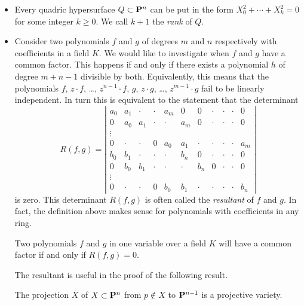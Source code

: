 \begin{itemize}
\item
  Every quadric hypersurface $Q \subset \P^n$ can be put in the form $X_0^2 + \cdots + X_k^2 = 0$ for some integer $k \geq 0$. We call $k+1$ the \emph{rank} of $Q$.
  
\item
  Consider two polynomials $f$ and $g$ of degrees $m$ and $n$ respectively with coefficients in a field $K$. We would like to investigate when $f$ and $g$ have a common factor. This happens if and only if there exists a polynomial $h$ of degree $m+n-1$ divisible by both. Equivalently, this means that the polynomials $f$, $z \cdot f$, \dots, $z^{n-1} \cdot f$, $g$, $z \cdot g$, \dots, $z^{m-1} \cdot g$ fail to be linearly independent. In turn this is equivalent to the statement that the determinant
  \[
  R(f,g) =
  \left|
    \begin{array}{ccccccccccc}
      a_0 & a_1 & \cdot & \cdot & a_m & 0   & 0 & \cdot & \cdot & \cdot & 0 \\
      0   & a_0 & a_1 & \cdot & \cdot & a_m & 0 & \cdot & \cdot & \cdot & 0 \\
      \vdots \\
      0   & \cdot & \cdot & 0 & a_0 & a_1 & \cdot & \cdot & \cdot & \cdot & a_m \\
      b_0 & b_1 & \cdot & \cdot & \cdot & b_n & 0 & \cdot & \cdot & \cdot & 0 \\
      0 & b_0 & b_1 & \cdot & \cdot & \cdot & b_n & 0 & \cdot & \cdot & 0 \\
      \vdots \\
      0 & \cdot & \cdot & 0 & b_0 & b_1 & \cdot & \cdot & \cdot & \cdot & b_n
    \end{array}
  \right|
  \]
  is zero. This determinant $R(f,g)$ is often called the \emph{resultant} of $f$ and $g$. In fact, the definition above makes sense for polynomials with coefficients in any ring.

  \begin{theorem}
    Two polynomials $f$ and $g$ in one variable over a field $K$ will have a common factor if and only if $R(f,g) = 0$.
  \end{theorem}

  The resultant is useful in the proof of the following result.
  
  \begin{theorem}
    The projection $\overline{X}$ of $X \subset \P^n$ from $p \notin X$ to $\P^{n-1}$ is a projective variety.
  \end{theorem}


\end{itemize}
